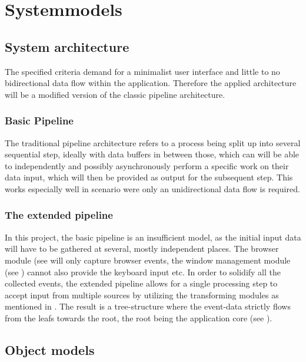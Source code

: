 \chapter{Systemmodels}
\label{ch:sysmodels}

\section{System architecture}
The specified criteria demand for a minimalist user interface and little to no bidirectional data flow within the application. Therefore the applied architecture will be a modified version of the classic pipeline architecture.

\subsection{Basic Pipeline}
The traditional pipeline architecture refers to a process being split up into several sequential step, ideally with data buffers in between those, which can will be able to independently and possibly asynchronously perform a specific work on their data input, which will then be provided as output for the subsequent step. This works especially well in scenario were only an unidirectional data flow is required.

\subsection{The extended pipeline}
In this project, the basic pipeline is an insufficient model, as the initial input data will have to be gathered at several, mostly independent places. The \gls{browser} module (see  will only capture \gls{browser} \glspl{event}, the window management \gls{module} (see ) cannot also provide the keyboard input etc. In order to solidify all the collected \glspl{event}, the extended pipeline allows for a single processing step to accept input from multiple sources by utilizing the transforming modules as mentioned in . The result is a tree-structure where the \gls{event}-data strictly flows from the leafs towards the root, the root being the application core (see ).

\section{Object models}

